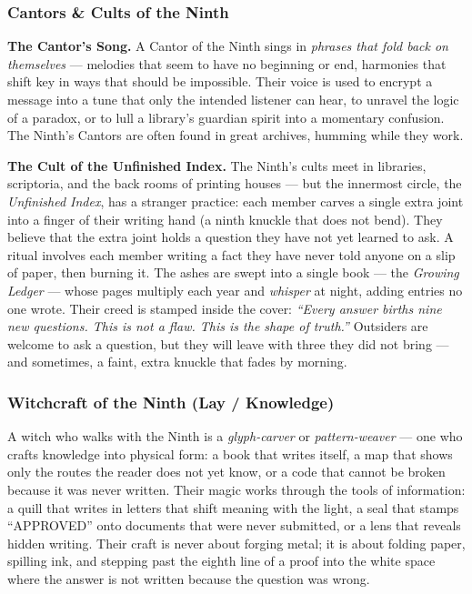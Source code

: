 \subsubsection*{Cantors \& Cults of the Ninth}

\textbf{The Cantor's Song.} A Cantor of the Ninth sings in \textit{phrases that fold back on themselves} --- melodies that seem to have no beginning or end, harmonies that shift key in ways that should be impossible. Their voice is used to encrypt a message into a tune that only the intended listener can hear, to unravel the logic of a paradox, or to lull a library's guardian spirit into a momentary confusion. The Ninth's Cantors are often found in great archives, humming while they work.

\textbf{The Cult of the Unfinished Index.} The Ninth's cults meet in libraries, scriptoria, and the back rooms of printing houses --- but the innermost circle, the \textit{Unfinished Index}, has a stranger practice: each member carves a single extra joint into a finger of their writing hand (a ninth knuckle that does not bend). They believe that the extra joint holds a question they have not yet learned to ask. A ritual involves each member writing a fact they have never told anyone on a slip of paper, then burning it. The ashes are swept into a single book --- the \textit{Growing Ledger} --- whose pages multiply each year and \textit{whisper} at night, adding entries no one wrote. Their creed is stamped inside the cover: \textit{``Every answer births nine new questions. This is not a flaw. This is the shape of truth.''} Outsiders are welcome to ask a question, but they will leave with three they did not bring --- and sometimes, a faint, extra knuckle that fades by morning.

\subsubsection*{Witchcraft of the Ninth (Lay / Knowledge)}

A witch who walks with the Ninth is a \textit{glyph-carver} or \textit{pattern-weaver} --- one who crafts knowledge into physical form: a book that writes itself, a map that shows only the routes the reader does not yet know, or a code that cannot be broken because it was never written. Their magic works through the tools of information: a quill that writes in letters that shift meaning with the light, a seal that stamps ``APPROVED'' onto documents that were never submitted, or a lens that reveals hidden writing. Their craft is never about forging metal; it is about folding paper, spilling ink, and stepping past the eighth line of a proof into the white space where the answer is not written because the question was wrong.

